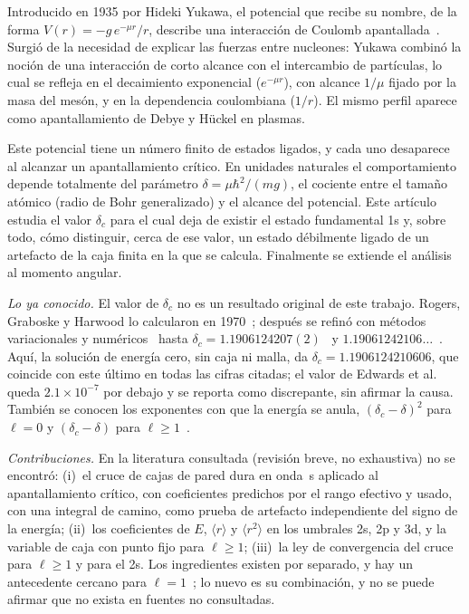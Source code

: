 \documentclass[10pt,letterpaper]{article}
\newcommand{\dc}{\delta_c}
\newcommand{\mr}{\langle r\rangle}
\newcommand{\ee}[2]{#1\times10^{#2}}
\newcommand{\hb}{\hbar}
\begin{document}
Introducido en 1935 por Hideki Yukawa, el potencial que recibe su nombre, de la forma $V(r)=-g\,e^{-\mu r}/r$, describe una interacción de Coulomb apantallada~\cite{Yukawa1935}. Surgió de la necesidad de explicar las fuerzas entre nucleones: Yukawa combinó la noción de una interacción de corto alcance con el intercambio de partículas, lo cual se refleja en el decaimiento exponencial ($e^{-\mu r}$), con alcance $1/\mu$ fijado por la masa del mesón, y en la dependencia coulombiana ($1/r$). El mismo perfil aparece como apantallamiento de Debye y Hückel en plasmas.

Este potencial tiene un número finito de estados ligados, y cada uno desaparece al alcanzar un apantallamiento crítico. En unidades naturales el comportamiento depende totalmente del parámetro $\delta=\mu\hb^2/(mg)$, el cociente entre el tamaño atómico (radio de Bohr generalizado) y el alcance del potencial. Este artículo estudia el valor $\dc$ para el cual deja de existir el estado fundamental 1s y, sobre todo, cómo distinguir, cerca de ese valor, un estado débilmente ligado de un artefacto de la caja finita en la que se calcula. Finalmente se extiende el análisis al momento angular.

\textit{Lo ya conocido.} El valor de $\dc$ no es un resultado original de este trabajo. Rogers, Graboske y Harwood lo calcularon en 1970~\cite{Rogers1970}; después se refinó con métodos variacionales y numéricos~\cite{Gomes1994,Edwards2017} hasta $\dc=1.1906124207(2)$~\cite{Napsuciale2021PLB} y $1.19061242106\ldots$~\cite{Gebremedhin2023}. Aquí, la solución de energía cero, sin caja ni malla, da $\dc=1.1906124210606$, que coincide con este último en todas las cifras citadas; el valor de Edwards et al.~\cite{Edwards2017} queda $\ee{2.1}{-7}$ por debajo y se reporta como discrepante, sin afirmar la causa. También se conocen los exponentes con que la energía se anula, $(\dc-\delta)^2$ para $\ell=0$ y $(\dc-\delta)$ para $\ell\ge1$~\cite{KlausSimon1980,Serra1998}.

\textit{Contribuciones.} En la literatura consultada (revisión breve, no exhaustiva) no se encontró: (i)~el cruce de cajas de pared dura en onda~s aplicado al apantallamiento crítico, con coeficientes predichos por el rango efectivo y usado, con una integral de camino, como prueba de artefacto independiente del signo de la energía; (ii)~los coeficientes de $E$, $\mr$ y $\langle r^2\rangle$ en los umbrales 2s, 2p y 3d, y la variable de caja con punto fijo para $\ell\ge1$; (iii)~la ley de convergencia del cruce para $\ell\ge1$ y para el 2s. Los ingredientes existen por separado, y hay un antecedente cercano para $\ell=1$~\cite{SerraSpatial}; lo nuevo es su combinación, y no se puede afirmar que no exista en fuentes no consultadas.
\end{document}
